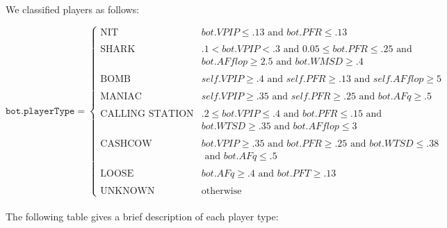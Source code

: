 \documentclass{article}
\begin{document}

We classified players as follows:

\[ \texttt{bot.playerType} = \begin{cases}
\text{NIT} & bot.VPIP \le .13 \text{ and } bot.PFR \le .13 \\\\
\text{SHARK} & .1 < bot.VPIP < .3 \text{ and } 0.05 \le bot.PFR \le .25 \text{ and } \\
& bot.AFflop \ge 2.5 \text{ and } bot.WMSD \ge .4 \\\\
\text{BOMB} & self.VPIP \ge .4 \text{ and } self.PFR \ge .13 \text{ and } self.AFflop \ge 5 \\\\
\text{MANIAC} & self.VPIP \ge .35 \text{ and } self.PFR \ge .25 \text{ and } bot.AFq \ge .5 \\\\
\text{CALLING STATION} & .2 \le bot.VPIP \le .4 \text{ and } bot.PFR \le .15 \text{ and } \\
& bot.WTSD \ge .35 \text{ and } bot.AFflop \le 3 \\\\
\text{CASHCOW} & bot.VPIP \ge .35 \text{ and } bot.PFR \ge .25 \text{ and } bot.WTSD \le .38 \\
& \text{ and } bot.AFq \le .5 \\\\
\text{LOOSE} & bot.AFq \ge .4 \text{ and } bot.PFT \ge .13 \\\\
\text{UNKNOWN} & \text{otherwise}
\end{cases}
\] \\

The following table gives a brief description of each player type: \\
\end{document}
